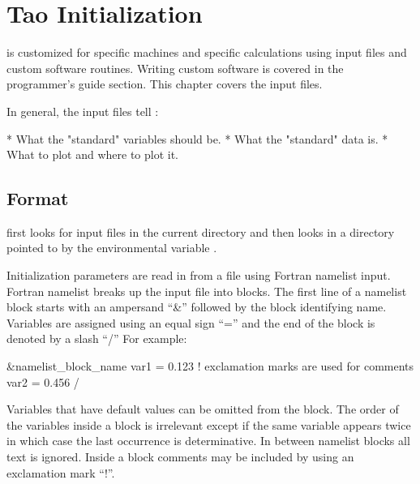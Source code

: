 \chapter{Tao Initialization}
\label{c:init}

\tao is customized for specific machines and specific calculations
using input files and custom software routines. Writing custom
software is covered in the programmer's guide section. This chapter
covers the input files.

In general, the input files tell \tao:
\begin{example}
  * What the "standard" variables should be.
  * What the "standard" data is.
  * What to plot and where to plot it.
\end{example}

\section{Format}
\label{s:format}

\tao first looks for input files in the current directory and then
looks in a directory pointed to by the environmental variable
.

Initialization parameters are read in from a file using Fortran
namelist input. Fortran namelist breaks up the input file into
blocks. The first line of a namelist block starts with an ampersand
``\&'' followed by the block identifying name. Variables are assigned
using an equal sign ``='' and the end of the block is denoted by a
slash ``/'' For example:
\begin{example}
  &namelist_block_name
    var1 = 0.123   ! exclamation marks are used for comments
    var2 = 0.456
  /
\end{example}
Variables that have default values can be omitted from the block.  The
order of the variables inside a block is irrelevant except if the
same variable appears twice in which case the last occurrence is determinative.
In between namelist blocks all text is ignored. Inside a block comments may be
included by using an exclamation mark ``!''.

